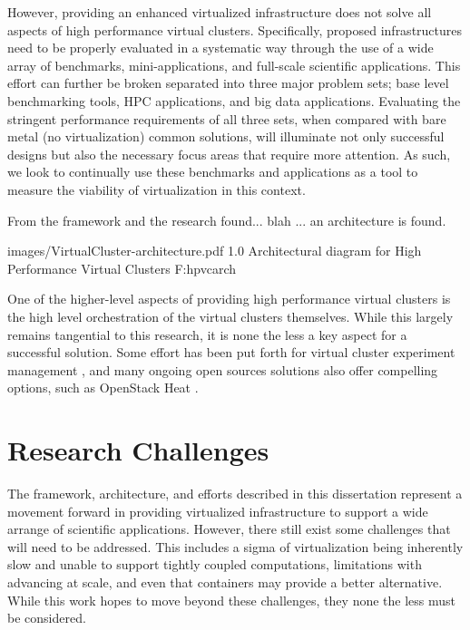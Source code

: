 However, providing an enhanced virtualized infrastructure does not solve all aspects of high performance virtual clusters. Specifically, proposed infrastructures need to be properly evaluated in a systematic way through the use of a wide array of benchmarks, mini-applications, and full-scale scientific applications. This effort can further be broken separated into three major problem sets; base level benchmarking tools, HPC applications, and big data applications. Evaluating the stringent performance requirements of all three sets, when compared with bare metal (no virtualization) common solutions, will illuminate not only successful designs but also the necessary focus areas that require more attention.  As such, we look to continually use these benchmarks and applications as a tool to measure the viability of virtualization in this context. 

From the framework and the research found... blah ... an architecture is found.  

  {images/VirtualCluster-architecture.pdf}
  {1.0}
  {Architectural diagram for High Performance Virtual Clusters}
  {F:hpvcarch}


One of the higher-level aspects of providing high performance virtual clusters is the high level orchestration of the virtual clusters themselves. While this largely remains tangential to this research, it is none the less a key aspect for a successful solution. Some effort has been put forth for virtual cluster experiment management \cite{las2010gce}, and many ongoing open sources solutions also offer compelling options, such as OpenStack Heat \cite{www-openstack-heat}.  


\section{Research Challenges}
\label{sec:chall}

The framework, architecture, and efforts described in this dissertation represent a movement forward in providing virtualized infrastructure to support a wide arrange of scientific applications. However, there still exist some challenges that will need to be addressed.  This includes a sigma of virtualization being inherently slow and unable to support tightly coupled computations, limitations with advancing at scale, and even that containers may provide a better alternative.  While this work hopes to move beyond these challenges, they none the less must be considered. 

